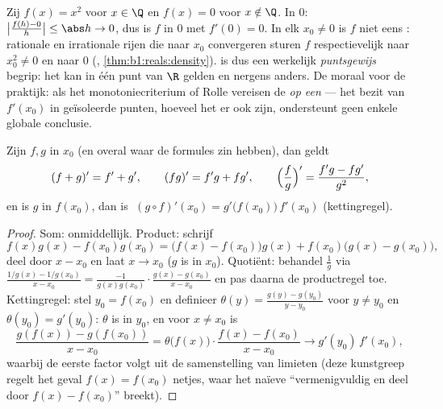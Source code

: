 \begin{example}\label{ex:b1:derivative:onepoint}
Zij $f(x) = x^2$ voor $x \in \Q$ en $f(x) = 0$ voor $x \notin
\Q$. In $0$: $\bigl|\frac{f(h) - 0}{h}\bigr| \leq \abs h \to 0$,
dus is $f$  in $0$ met $f'(0) = 0$. In elk $x_0 \neq 0$
is $f$ niet eens : rationale en irrationale rijen die naar
$x_0$ convergeren sturen $f$ respectievelijk naar $x_0^2 \neq 0$
en naar $0$ (, \cref{thm:b1:reals:density}).
 is dus een werkelijk \emph{puntsgewijs} begrip: het
kan in één punt van $\R$ gelden en nergens anders. De moraal voor
de praktijk:  als het monotoniecriterium of Rolle
vereisen de  \emph{op een } --- het bezit van
$f'(x_0)$ in geïsoleerde punten, hoeveel het er ook zijn,
ondersteunt geen enkele globale conclusie.
\end{example}

\begin{theorem}[Bewerkingen]\label{thm:b1:derivative:operations}
Zijn $f, g$  in $x_0$ (en overal waar de formules zin
hebben), dan geldt
\[
(f + g)' = f' + g', \qquad
(fg)' = f'g + fg', \qquad
\Bigl(\frac fg\Bigr)' = \frac{f'g - fg'}{g^2},
\]
en is $g$  in $f(x_0)$, dan is $\;(g \circ f)'(x_0) =
g'\bigl(f(x_0)\bigr)\, f'(x_0)$ (kettingregel).
\end{theorem}

\begin{proof}
Som: onmiddellijk. Product: schrijf
\[
f(x)g(x) - f(x_0)g(x_0)
= \bigl(f(x) - f(x_0)\bigr) g(x) + f(x_0)\bigl(g(x) - g(x_0)\bigr),
\]
deel door $x - x_0$ en laat $x \to x_0$ ($g$ is  in $x_0$).
Quotiënt: behandel $\frac 1g$ via $\frac{1/g(x) - 1/g(x_0)}{x - x_0}
= \frac{-1}{g(x)g(x_0)}\cdot\frac{g(x) - g(x_0)}{x - x_0}$ en pas
daarna de productregel toe. Kettingregel: stel $y_0 = f(x_0)$ en
definieer $\theta(y) = \frac{g(y) - g(y_0)}{y - y_0}$ voor $y \neq
y_0$ en $\theta(y_0) = g'(y_0)$: $\theta$ is  in $y_0$, en
voor $x \neq x_0$ is
\[
\frac{g(f(x)) - g(f(x_0))}{x - x_0}
= \theta\bigl(f(x)\bigr)\cdot \frac{f(x) - f(x_0)}{x - x_0}
\longrightarrow g'(y_0)\, f'(x_0),
\]
waarbij de eerste factor volgt uit de samenstelling van limieten
(deze kunstgreep regelt het geval $f(x) = f(x_0)$ netjes, waar het
naïeve ``vermenigvuldig en deel door $f(x) - f(x_0)$'' breekt).
\end{proof}

